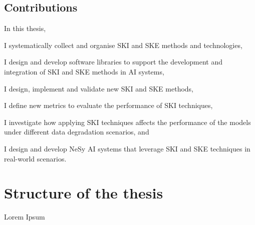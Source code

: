 \begin{refsection}
\subsection*{Contributions}
%
In this thesis,
%
\begin{inlinelist}
    \item I systematically collect and organise \ac{SKI} and \ac{SKE} methods and technologies,
    \item I design and develop software libraries to support the development and integration of \ac{SKI} and \ac{SKE} methods in \ac{AI} systems,
    \item I design, implement and validate new \ac{SKI} and \ac{SKE} methods,
    \item I define new metrics to evaluate the performance of \ac{SKI} techniques,
    \item I investigate how applying \ac{SKI} techniques affects the performance of the models under different data degradation scenarios, and
    \item I design and develop \ac{NeSy} \ac{AI} systems that leverage \ac{SKI} and \ac{SKE} techniques in real-world scenarios.
\end{inlinelist}


\section{Structure of the thesis}
\label{sec:structure-of-the-thesis}
%
Lorem Ipsum

\printbibliography[title=Reference,heading=bibintoc]

\end{refsection}